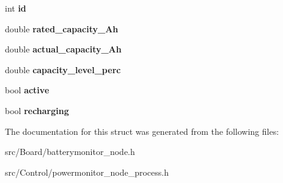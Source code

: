\begin{DoxyCompactItemize}
int {\bfseries id}
\item 
\mbox{\label{structBattery_a7c9e77d7e0bf6ad26a5741b7915de0c7}} 
double {\bfseries rated\+\_\+capacity\+\_\+\+Ah}
\item 
\mbox{\label{structBattery_a36ff5c21c8a55007022d1b519a1a0854}} 
double {\bfseries actual\+\_\+capacity\+\_\+\+Ah}
\item 
\mbox{\label{structBattery_a28503514062ce08541de421ba7b6d95d}} 
double {\bfseries capacity\+\_\+level\+\_\+perc}
\item 
\mbox{\label{structBattery_a4a86029edf113f07fe2ec732bc1f4e88}} 
bool {\bfseries active}
\item 
\mbox{\label{structBattery_ad652ec921c85600b91f28193377f5173}} 
bool {\bfseries recharging}
\end{DoxyCompactItemize}


The documentation for this struct was generated from the following files\+:\begin{DoxyCompactItemize}
\item 
src/\+Board/batterymonitor\+\_\+node.\+h\item 
src/\+Control/powermonitor\+\_\+node\+\_\+process.\+h\end{DoxyCompactItemize}
